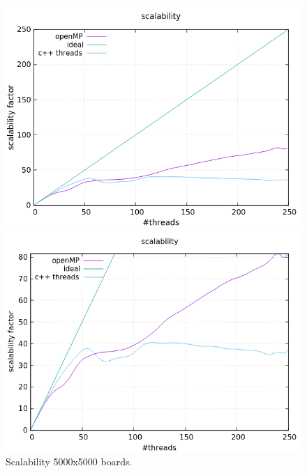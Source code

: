 \documentclass[a4paper,10pt]{article}
\begin{document}
\begin{figure}[H]
	\centering
	\begin{minipage}[t]{0.55\linewidth}
		\includegraphics[width=\linewidth]{5000_standard_scal.png}
	\end{minipage}%
	\begin{minipage}[t]{0.55\linewidth}
		\includegraphics[width=\linewidth]{5000_zoomed_scal.png}
	\end{minipage}
	\caption{Scalability 5000x5000 boards.}
	\label{50000Scal}
\end{figure}
\end{document}
